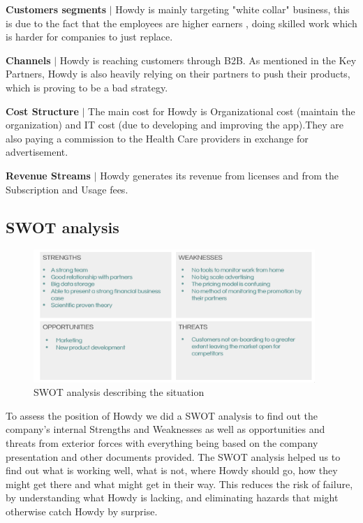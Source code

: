 \noindent \textbf{Customers segments} $|$ Howdy is mainly targeting "white collar" business, this is due to the fact that the employees are higher earners , doing skilled work which is harder for companies to just replace.

\noindent \textbf{Channels} $|$ Howdy is reaching customers through B2B. As mentioned in the Key Partners, Howdy is also heavily relying on their partners to push their products, which is proving to be a bad strategy. 

\noindent \textbf{Cost Structure} $|$ The main cost for Howdy is Organizational cost (maintain the organization) and IT cost (due to developing and improving the app).They are also paying a commission to the Health Care providers in exchange for advertisement. 

\noindent \textbf{Revenue Streams} $|$ Howdy generates its revenue from licenses and from the Subscription and Usage fees.



\subsection{SWOT analysis}

\begin{figure}[H]
\centering
\includegraphics[width=0.95\textwidth]{figures/SWOT.png}
\caption{SWOT analysis describing the situation}
\end{figure}
To assess the position of Howdy we did a SWOT analysis to find out the company’s internal Strengths and Weaknesses as well as opportunities and threats from exterior forces with everything being based on the company presentation and other documents provided. The SWOT analysis helped us to find out what is working well, what is not, where Howdy should go, how they might get there and what might get in their way. This reduces the risk of failure, by understanding what Howdy is lacking, and eliminating hazards that might otherwise catch Howdy by surprise.

